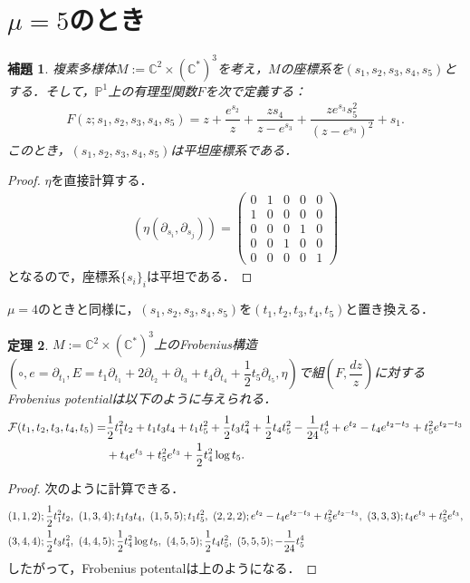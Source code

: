 \documentclass[a4paper,11pt]{jbook}
\theoremstyle{plain}
\newtheorem{thm}{定理}[section]
\newtheorem{lem}[thm]{補題}
\theoremstyle{definition}
\theoremstyle{remark}
\theoremstyle{proof}
\numberwithin{equation}{section}
\def\CC{{\mathbb C}}
\def\PP{{\mathbb P}}
\def\F{{\mathcal F}}
\begin{document}
\section{$\mu=5$のとき}%
\begin{lem}
複素多様体$M:=\CC^2\times(\CC^*)^3$を考え，$M$の座標系を$(s_1,s_2,s_3,s_4,s_5)$とする．そして，$\PP^1$上の有理型関数$F$を次で定義する：
\begin{align}F(z;s_1,s_2,s_3,s_4,s_5)=z+\dfrac{e^{s_2}}{z}+\dfrac{zs_4}{z-e^{s_3}}+\dfrac{ze^{s_3}s_5^2}{(z-e^{s_3})^2}+s_1.\end{align}
このとき，$(s_1,s_2,s_3,s_4,s_5)$は平坦座標系である．
\end{lem}
\begin{proof}
$\eta$を直接計算する．
\begin{align}
(\eta(\partial_{s_i},\partial_{s_j}))=
\begin{pmatrix}
0&1&0&0&0\\
1&0&0&0&0\\
0&0&0&1&0\\
0&0&1&0&0\\
0&0&0&0&1
\end{pmatrix}
\end{align}
となるので，座標系$\{s_i\}_i$は平坦である．
\end{proof}
\noindent$\mu=4$のときと同様に，$(s_1,s_2,s_3,s_4,s_5)$を$(t_1,t_2,t_3,t_4,t_5)$と置き換える．

\begin{thm}
$M:=\CC^2\times(\CC^*)^3$上の\rm{Frobenius構造}$(\circ,e=\partial_{t_1},E=t_1\partial_{t_1}+2\partial_{t_2}+\partial_{t_3}+t_4\partial_{t_4}+\dfrac{1}{2}t_5\partial_{t_5},\eta)$で組$\left(F,\dfrac{dz}{z}\right)$に対するFrobenius potentialは以下のように与えられる．
\begin{align}
	\F(t_1,t_2,t_3,t_4,t_5)=&\frac{1}{2}t_1^2t_2+t_1t_3t_4+t_1t_5^2+\frac{1}{2}t_3t_4^2+\dfrac{1}{2}t_4t_5^2-\dfrac{1}{24}t_5^4+e^{t_2}-t_4e^{t_2-t_3}+t_5^2e^{t_2-t_3} \notag \\ 
&+t_4e^{t_3}+t_5^2e^{t_3}+\frac{1}{2}t_4^2\log{t_5}.
\end{align}
\end{thm}

\begin{proof}
次のように計算できる． 
\begin{align}
&(1,1,2) ; \dfrac{1}{2}t_1^2t_2, \ (1,3,4) ; t_1t_3t_4, \ (1,5,5) ; t_1t_5^2, \ (2,2,2);e^{t_2}-t_4e^{t_2-t_3}+t_5^2e^{t_2-t_3}, \ (3,3,3) ; t_4e^{t_3}+t_5^2e^{t_3}, \notag \\
&(3,4,4) ; \dfrac{1}{2}t_3t_4^2, \ (4,4,5) ; \dfrac{1}{2}t_4^2\log{t_5}, \ (4,5,5) ; \dfrac{1}{2}t_4t_5^2, \ (5,5,5) ; -\dfrac{1}{24}t_5^4 \notag
\end{align}
したがって，Frobenius potentalは上のようになる．
\end{proof}
\end{document}
